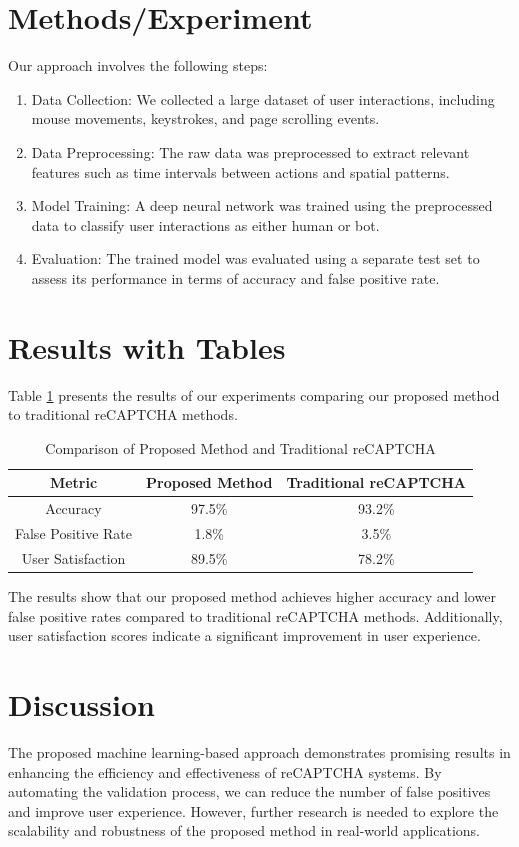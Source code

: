 \documentclass{article}
\begin{document}
\section{Methods/Experiment}
Our approach involves the following steps:
\begin{enumerate}
    \item Data Collection: We collected a large dataset of user interactions, including mouse movements, keystrokes, and page scrolling events.
    \item Data Preprocessing: The raw data was preprocessed to extract relevant features such as time intervals between actions and spatial patterns.
    \item Model Training: A deep neural network was trained using the preprocessed data to classify user interactions as either human or bot.
    \item Evaluation: The trained model was evaluated using a separate test set to assess its performance in terms of accuracy and false positive rate.
\end{enumerate}

\section{Results with Tables}
Table \ref{tab:results} presents the results of our experiments comparing our proposed method to traditional reCAPTCHA methods.

\begin{table}[ht]
\centering
\caption{Comparison of Proposed Method and Traditional reCAPTCHA}
\label{tab:results}
\begin{tabular}{|c|c|c|}
\hline
Metric & Proposed Method & Traditional reCAPTCHA \\
\hline
Accuracy & 97.5\% & 93.2\% \\
\hline
False Positive Rate & 1.8\% & 3.5\% \\
\hline
User Satisfaction & 89.5\% & 78.2\% \\
\hline
\end{tabular}
\end{table}

The results show that our proposed method achieves higher accuracy and lower false positive rates compared to traditional reCAPTCHA methods. Additionally, user satisfaction scores indicate a significant improvement in user experience.

\section{Discussion}
The proposed machine learning-based approach demonstrates promising results in enhancing the efficiency and effectiveness of reCAPTCHA systems. By automating the validation process, we can reduce the number of false positives and improve user experience. However, further research is needed to explore the scalability and robustness of the proposed method in real-world applications.
\end{document}
